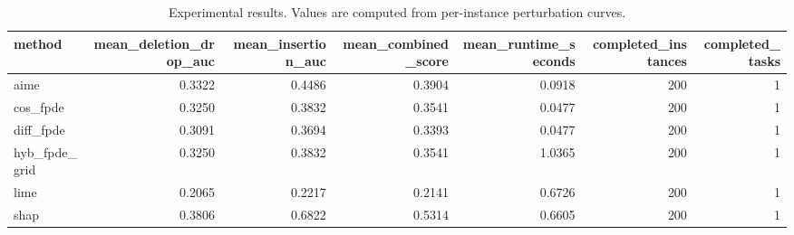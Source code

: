 \begin{table}[t]
\caption{Experimental results. Values are computed from per-instance perturbation curves.}
\label{tab:main_results_computed}
\centering
\begin{tabular}{lrrrrrr}
\toprule
method & mean\_deletion\_drop\_auc & mean\_insertion\_auc & mean\_combined\_score & mean\_runtime\_seconds & completed\_instances & completed\_tasks \\
\midrule
aime & 0.3322 & 0.4486 & 0.3904 & 0.0918 & 200 & 1 \\
cos\_fpde & 0.3250 & 0.3832 & 0.3541 & 0.0477 & 200 & 1 \\
diff\_fpde & 0.3091 & 0.3694 & 0.3393 & 0.0477 & 200 & 1 \\
hyb\_fpde\_grid & 0.3250 & 0.3832 & 0.3541 & 1.0365 & 200 & 1 \\
lime & 0.2065 & 0.2217 & 0.2141 & 0.6726 & 200 & 1 \\
shap & 0.3806 & 0.6822 & 0.5314 & 0.6605 & 200 & 1 \\
\bottomrule
\end{tabular}

\end{table}
